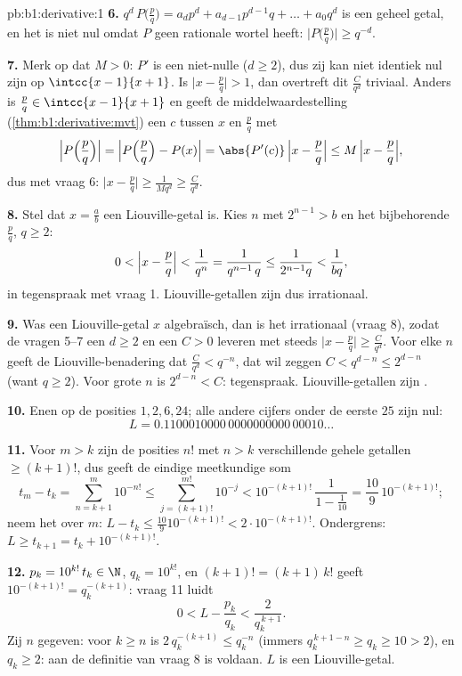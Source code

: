 \begin{solution}{pb:b1:derivative:1}
\textbf{6.} $q^d\,P\bigl(\frac pq\bigr) = a_d p^d + a_{d-1}
p^{d-1} q + \dots + a_0 q^d$ is een geheel getal, en het is niet
nul omdat $P$ geen rationale wortel heeft:
$\bigl|P\bigl(\frac pq\bigr)\bigr| \geq q^{-d}$.

\textbf{7.} Merk op dat $M > 0$: $P'$ is een niet-nulle 
($d \geq 2$), dus zij kan niet identiek nul zijn op
$\intcc{x-1}{x+1}$. Is $\bigl|x - \frac pq\bigr| > 1$, dan
overtreft dit $\frac{C}{q^d}$ triviaal. Anders is $\frac pq \in
\intcc{x-1}{x+1}$ en geeft de middelwaardestelling
(\cref{thm:b1:derivative:mvt}) een $c$ tussen $x$ en $\frac pq$
met
\[
\Bigl|P\Bigl(\frac pq\Bigr)\Bigr|
= \Bigl|P\Bigl(\frac pq\Bigr) - P(x)\Bigr|
= \abs{P'(c)}\,\Bigl|x - \frac pq\Bigr|
\leq M\,\Bigl|x - \frac pq\Bigr| ,
\]
dus met vraag 6: $\bigl|x - \frac pq\bigr| \geq \frac{1}{Mq^d}
\geq \frac{C}{q^d}$.

\textbf{8.} Stel dat $x = \frac ab$ een Liouville-getal is. Kies
$n$ met $2^{n-1} > b$ en het bijbehorende $\frac pq$, $q \geq 2$:
\[
0 < \Bigl|x - \frac pq\Bigr| < \frac{1}{q^n}
= \frac{1}{q^{n-1}\,q} \leq \frac{1}{2^{n-1} q} <
\frac{1}{bq} ,
\]
in tegenspraak met vraag 1. Liouville-getallen zijn dus
irrationaal.

\textbf{9.} Was een Liouville-getal $x$ algebraïsch, dan is het
irrationaal (vraag 8), zodat de vragen 5--7 een $d \geq 2$ en een
$C > 0$ leveren met steeds $\bigl|x - \frac pq\bigr| \geq
\frac{C}{q^d}$. Voor elke $n$ geeft de Liouville-benadering dat
$\frac{C}{q^d} < q^{-n}$, dat wil zeggen $C < q^{d-n} \leq
2^{d-n}$ (want $q \geq 2$). Voor grote $n$ is $2^{d-n} < C$:
tegenspraak. Liouville-getallen zijn .

\textbf{10.} Enen op de posities $1, 2, 6, 24$; alle andere
cijfers onder de eerste $25$ zijn nul:
\[
L = 0.1100010000\,0000000000\,00010\dots
\]

\textbf{11.} Voor $m > k$ zijn de posities $n!$ met $n > k$
verschillende gehele getallen $\geq (k+1)!$, dus geeft de eindige
meetkundige som
\[
t_m - t_k = \sum_{n=k+1}^{m} 10^{-n!}
\leq \sum_{j = (k+1)!}^{m!} 10^{-j}
< 10^{-(k+1)!}\,\frac{1}{1 - \frac1{10}}
= \frac{10}{9}\,10^{-(k+1)!} ;
\]
neem het  over $m$: $L - t_k \leq
\frac{10}{9}10^{-(k+1)!} < 2\cdot10^{-(k+1)!}$. Ondergrens: $L
\geq t_{k+1} = t_k + 10^{-(k+1)!}$.

\textbf{12.} $p_k = 10^{k!}\,t_k \in \N$, $q_k = 10^{k!}$, en
$(k+1)! = (k+1)\,k!$ geeft $10^{-(k+1)!} = q_k^{-(k+1)}$: vraag
11 luidt
\[
0 < L - \frac{p_k}{q_k} < \frac{2}{q_k^{\,k+1}} .
\]
Zij $n$ gegeven: voor $k \geq n$ is $2\,q_k^{-(k+1)} \leq
q_k^{-n}$ (immers $q_k^{\,k+1-n} \geq q_k \geq 10 > 2$), en $q_k
\geq 2$: aan de definitie van vraag 8 is voldaan. $L$ is een
Liouville-getal.


\end{solution}

